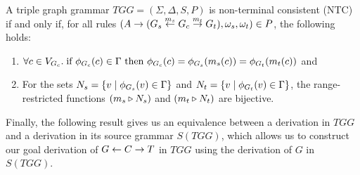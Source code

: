 \documentclass[]{report}
\begin{document}
\begin{definition}
	A triple graph grammar $TGG = (\Sigma, \Delta, S, P)$ is non-terminal consistent (NTC) if and only if, for all rules $(A \pro (G_s \ms{m_s} G_c \mt{m_t} G_t), \omega_s, \omega_t) \in P$, the following holds:
	\begin{enumerate}
		\item $\forall c \in V_{G_c} \. \text{if } \phi_{G_c}(c) \in \Gamma \text{ then } \phi_{G_c}(c) = \phi_{G_s}(m_s(c)) = \phi_{G_t}(m_t(c))$ and
		\item For the sets $N_s = \{v \st \phi_{G_s}(v) \in \Gamma\}$ and $N_t = \{v \st \phi_{G_t}(v) \in \Gamma\}$, the range-restricted functions $(m_s \rrestr N_s)$ and $(m_t \rrestr N_t)$ are bijective.
	\end{enumerate}
\end{definition}

Finally, the following result gives us an equivalence between a derivation in $TGG$ and a derivation in its source grammar $S(TGG)$, which allows us to construct our goal derivation of $G \ms{} C \mt{} T$ in $TGG$ using the derivation of $G$ in $S(TGG)$.
\end{document}
